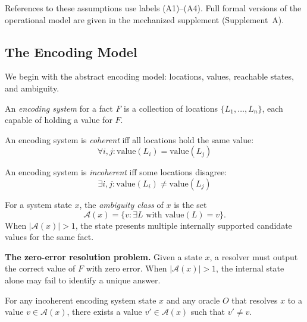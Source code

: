 References to these assumptions use labels (A1)--(A4). Full formal versions of the operational model are given in the mechanized supplement (Supplement~A).

\subsection{The Encoding Model}\label{sec:epistemic}

We begin with the abstract encoding model: locations, values, reachable states, and ambiguity.

\begin{definition}\label{def:encoding-system}
An \emph{encoding system} for a fact $F$ is a collection of locations $\{L_1, \ldots, L_n\}$, each capable of holding a value for $F$.
\end{definition}

\begin{definition}[Coherence]\label{def:coherence}
An encoding system is \emph{coherent} iff all locations hold the same value:
\[
\forall i, j: \text{value}(L_i) = \text{value}(L_j)
\]
\end{definition}

\begin{definition}[Incoherence]\label{def:incoherence}
An encoding system is \emph{incoherent} iff some locations disagree:
\[
\exists i, j: \text{value}(L_i) \neq \text{value}(L_j)
\]
\end{definition}

\begin{definition}\label{def:ambiguity-class}
For a system state $x$, the \emph{ambiguity class} of $x$ is the set
\[
\mathcal A(x) = \{v : \exists L \text{ with } \text{value}(L)=v\}.
\]
When $|\mathcal A(x)|>1$, the state presents multiple internally supported candidate values for the same fact.
\end{definition}

\textbf{The zero-error resolution problem.} Given a state $x$, a resolver must output the correct value of $F$ with zero error. When $|\mathcal A(x)|>1$, the internal state alone may fail to identify a unique answer.

\begin{theorem}\label{thm:oracle-arbitrary}
For any incoherent encoding system state $x$ and any oracle $O$ that resolves $x$ to a value $v \in \mathcal A(x)$, there exists a value $v' \in \mathcal A(x)$ such that $v' \neq v$.
\end{theorem}

